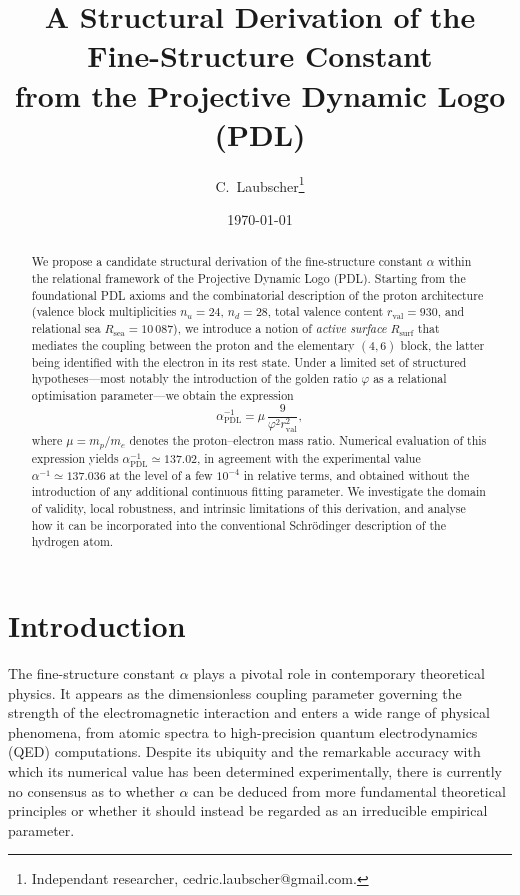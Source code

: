 \documentclass[11pt,a4paper]{article}
\title{
  A Structural Derivation of the Fine-Structure Constant \\
  from the Projective Dynamic Logo (PDL)
}
\author{
  C.~Laubscher\thanks{Independant researcher, cedric.laubscher@gmail.com.}
}
\date{\today}
\theoremstyle{plain}
\theoremstyle{definition}
\theoremstyle{remark}
\begin{document}
\maketitle

\begin{abstract}
We propose a candidate structural derivation of the fine-structure constant
\(\alpha\) within the relational framework of the Projective Dynamic Logo (PDL). Starting from the foundational PDL axioms and the combinatorial description of the proton architecture (valence block multiplicities \(n_u = 24\), \(n_d = 28\), total valence content \(r_{\mathrm{val}} = 930\), and relational sea \(R_{\mathrm{sea}} = 10\,087\)), we introduce a notion of \emph{active surface} \(R_{\mathrm{surf}}\) that mediates the coupling between the proton and the elementary \((4,6)\) block, the latter being identified with the electron in its rest state. Under a limited set of structured hypotheses—most notably the introduction of the golden ratio \(\varphi\) as a relational optimisation parameter—we obtain the expression
\[
\alpha_{\mathrm{PDL}}^{-1} = \mu\,\frac{9}{\varphi^2 r_{\mathrm{val}}^2},
\]
where \(\mu = m_p/m_e\) denotes the proton–electron mass ratio. Numerical evaluation of this expression yields \(\alpha_{\mathrm{PDL}}^{-1} \simeq 137.02\), in agreement with the experimental value \(\alpha^{-1} \simeq 137.036\) at the level of a few \(10^{-4}\) in relative terms, and obtained without the introduction of any additional continuous fitting parameter. We investigate the domain of validity, local robustness, and intrinsic limitations of this derivation, and analyse how it can be incorporated into the conventional Schrödinger description of the hydrogen atom.
\end{abstract}

\section{Introduction}

The fine-structure constant \(\alpha\) plays a pivotal role in contemporary theoretical physics. It appears as the dimensionless coupling parameter governing the strength of the electromagnetic interaction and enters a wide range of physical phenomena, from atomic spectra to high-precision quantum electrodynamics (QED) computations. Despite its ubiquity and the remarkable accuracy with which its numerical value has been determined experimentally, there is currently no consensus as to whether \(\alpha\) can be deduced from more fundamental theoretical principles or whether it should instead be regarded as an irreducible empirical parameter.
\end{document}
